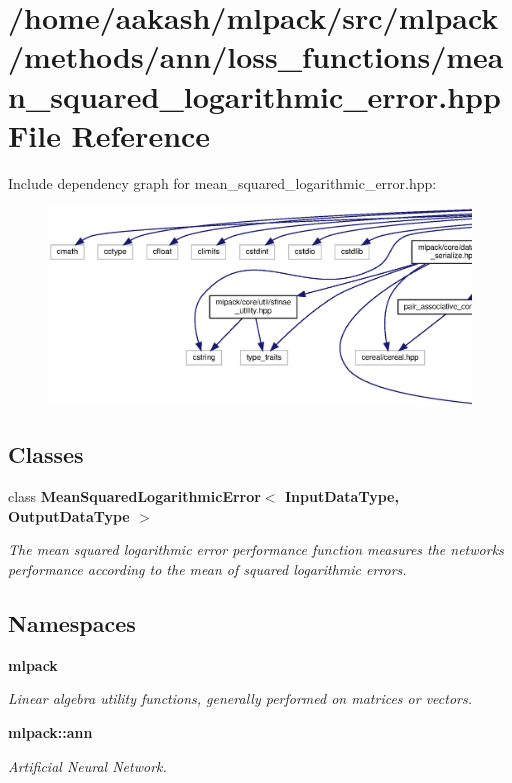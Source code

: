 \section{/home/aakash/mlpack/src/mlpack/methods/ann/loss\+\_\+functions/mean\+\_\+squared\+\_\+logarithmic\+\_\+error.hpp File Reference}
\label{mean__squared__logarithmic__error_8hpp}
Include dependency graph for mean\+\_\+squared\+\_\+logarithmic\+\_\+error.\+hpp\+:
\nopagebreak
\begin{figure}[H]
\begin{center}
\leavevmode
\includegraphics[width=350pt]{mean__squared__logarithmic__error_8hpp__incl}
\end{center}
\end{figure}
\subsection*{Classes}
\begin{DoxyCompactItemize}
\item 
class \textbf{ Mean\+Squared\+Logarithmic\+Error$<$ Input\+Data\+Type, Output\+Data\+Type $>$}
\begin{DoxyCompactList}\small\item\em The mean squared logarithmic error performance function measures the network\textquotesingle{}s performance according to the mean of squared logarithmic errors. \end{DoxyCompactList}\end{DoxyCompactItemize}
\subsection*{Namespaces}
\begin{DoxyCompactItemize}
\item 
 \textbf{ mlpack}
\begin{DoxyCompactList}\small\item\em Linear algebra utility functions, generally performed on matrices or vectors. \end{DoxyCompactList}\item 
 \textbf{ mlpack\+::ann}
\begin{DoxyCompactList}\small\item\em Artificial Neural Network. \end{DoxyCompactList}\end{DoxyCompactItemize}


